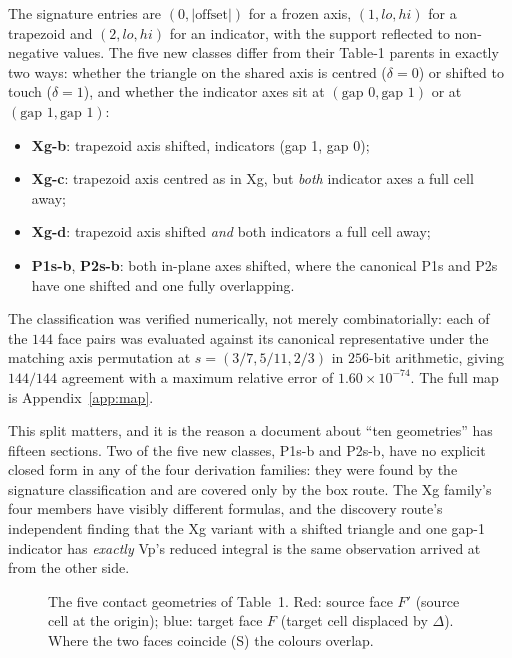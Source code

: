 \documentclass[11pt]{article}
\theoremstyle{remark}
\begin{document}
\noindent
The signature entries are $(0, |\text{offset}|)$ for a frozen axis, $(1, lo, hi)$ for a
trapezoid and $(2, lo, hi)$ for an indicator, with the support reflected to non-negative
values. The five new classes differ from their Table-1 parents in exactly two ways: whether
the triangle on the shared axis is centred ($\delta = 0$) or shifted to touch
($\delta = 1$), and whether the indicator axes sit at $(\text{gap }0, \text{gap }1)$ or at
$(\text{gap }1, \text{gap }1)$:
\begin{itemize}[nosep]
\item \textbf{Xg-b}: trapezoid axis shifted, indicators (gap 1, gap 0);
\item \textbf{Xg-c}: trapezoid axis centred as in Xg, but \emph{both} indicator axes a
full cell away;
\item \textbf{Xg-d}: trapezoid axis shifted \emph{and} both indicators a full cell away;
\item \textbf{P1s-b}, \textbf{P2s-b}: both in-plane axes shifted, where the canonical P1s
and P2s have one shifted and one fully overlapping.
\end{itemize}
The classification was verified numerically, not merely combinatorially: each of the $144$
face pairs was evaluated against its canonical representative under the matching axis
permutation at $s = (3/7, 5/11, 2/3)$ in $256$-bit arithmetic, giving $144/144$ agreement
with a maximum relative error of $1.60\times10^{-74}$. The full map is
Appendix~\ref{app:map}.

This split matters, and it is the reason a document about ``ten geometries'' has fifteen
sections. Two of the five new classes, P1s-b and P2s-b, have no explicit closed form in
any of the four derivation families: they were found by the signature classification and
are covered only by the box route. The Xg family's four members have visibly different
formulas, and the discovery route's independent finding that the Xg variant with a shifted
triangle and one gap-1 indicator has \emph{exactly} Vp's reduced integral is the same
observation arrived at from the other side.

\begin{figure}[htbp]

\caption{The five contact geometries of Table~1. Red: source face $F'$ (source cell at the
origin); blue: target face $F$ (target cell displaced by $\Delta$). Where the two faces
coincide (S) the colours overlap.}
\label{fig:contact}
\end{figure}
\end{document}
